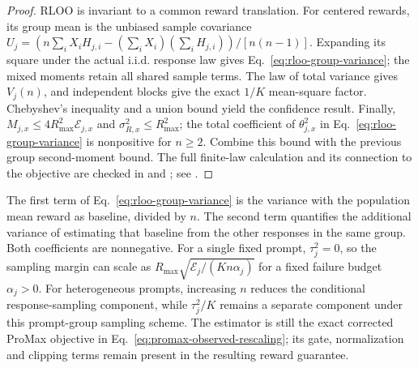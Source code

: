 \begin{proof}
RLOO is invariant to a common reward translation. For centered rewards,
its group mean is the unbiased sample covariance
$U_j=(n\sum_iX_iH_{j,i}-(\sum_iX_i)(\sum_iH_{j,i}))/[n(n-1)]$.
Expanding its square under the actual i.i.d. response law gives
Eq.~\eqref{eq:rloo-group-variance}; the mixed moments retain all shared
sample terms. The law of total variance gives $V_j(n)$, and independent
blocks give the exact $1/K$ mean-square factor. Chebyshev's inequality and
a union bound yield the confidence result. Finally,
$M_{j,x}\le4R_{\max}^2\mathcal E_{j,x}$ and
$\sigma_{R,x}^2\le R_{\max}^2$; the total coefficient of
$\theta_{j,x}^2$ in Eq.~\eqref{eq:rloo-group-variance} is nonpositive for
$n\ge2$. Combine this bound with the previous group second-moment bound.
The full finite-law calculation and its connection to the objective are
checked in  and
; see .
\end{proof}

The first term of Eq.~\eqref{eq:rloo-group-variance} is the variance with
the population mean reward as baseline, divided by $n$. The second term
quantifies the additional variance of estimating that baseline from the
other responses in the same group. Both coefficients are nonnegative.
For a single fixed prompt, $\tau_j^2=0$, so the sampling margin can scale
as $R_{\max}\sqrt{\mathcal E_j/(Kn\alpha_j)}$ for a fixed failure budget
$\alpha_j>0$. For heterogeneous prompts, increasing $n$ reduces the
conditional response-sampling component, while $\tau_j^2/K$ remains a
separate component under this prompt-group sampling scheme.
The estimator is still the exact corrected ProMax objective in
Eq.~\eqref{eq:promax-observed-rescaling}; its gate, normalization and
clipping terms remain present in the resulting reward guarantee.

